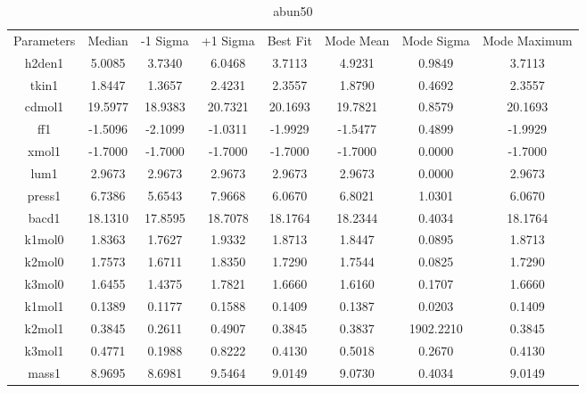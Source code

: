 \begin{table}
\caption{abun50}
\begin{tabular}{cccccccc}
Parameters & Median & -1 Sigma & +1 Sigma & Best Fit & Mode Mean & Mode Sigma & Mode Maximum \\
h2den1 & 5.0085 & 3.7340 & 6.0468 & 3.7113 & 4.9231 & 0.9849 & 3.7113 \\
tkin1 & 1.8447 & 1.3657 & 2.4231 & 2.3557 & 1.8790 & 0.4692 & 2.3557 \\
cdmol1 & 19.5977 & 18.9383 & 20.7321 & 20.1693 & 19.7821 & 0.8579 & 20.1693 \\
ff1 & -1.5096 & -2.1099 & -1.0311 & -1.9929 & -1.5477 & 0.4899 & -1.9929 \\
xmol1 & -1.7000 & -1.7000 & -1.7000 & -1.7000 & -1.7000 & 0.0000 & -1.7000 \\
lum1 & 2.9673 & 2.9673 & 2.9673 & 2.9673 & 2.9673 & 0.0000 & 2.9673 \\
press1 & 6.7386 & 5.6543 & 7.9668 & 6.0670 & 6.8021 & 1.0301 & 6.0670 \\
bacd1 & 18.1310 & 17.8595 & 18.7078 & 18.1764 & 18.2344 & 0.4034 & 18.1764 \\
k1mol0 & 1.8363 & 1.7627 & 1.9332 & 1.8713 & 1.8447 & 0.0895 & 1.8713 \\
k2mol0 & 1.7573 & 1.6711 & 1.8350 & 1.7290 & 1.7544 & 0.0825 & 1.7290 \\
k3mol0 & 1.6455 & 1.4375 & 1.7821 & 1.6660 & 1.6160 & 0.1707 & 1.6660 \\
k1mol1 & 0.1389 & 0.1177 & 0.1588 & 0.1409 & 0.1387 & 0.0203 & 0.1409 \\
k2mol1 & 0.3845 & 0.2611 & 0.4907 & 0.3845 & 0.3837 & 1902.2210 & 0.3845 \\
k3mol1 & 0.4771 & 0.1988 & 0.8222 & 0.4130 & 0.5018 & 0.2670 & 0.4130 \\
mass1 & 8.9695 & 8.6981 & 9.5464 & 9.0149 & 9.0730 & 0.4034 & 9.0149 \\
\end{tabular}
\end{table}
